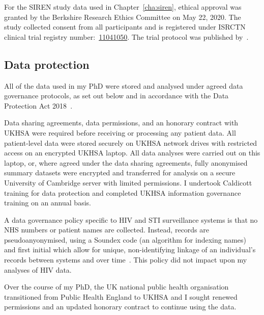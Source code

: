 For the SIREN study data used in Chapter~\ref{cha:siren}, ethical approval was granted by the Berkshire Research Ethics Committee on May 22, 2020. The study collected consent from all participants and is registered under ISRCTN clinical trial registry number:\ \href{https://doi.org/10.1186/ISRCTN11041050}{11041050}. The trial protocol was published by~\cite{Wallace2022-vs}.

\subsection{Data protection}

All of the data used in my PhD were stored and analysed under agreed data governance protocols, as set out below and in accordance with the Data Protection Act 2018~\parencite{Spencer2019-ga}.

Data sharing agreements, data permissions, and an honorary contract with UKHSA were required before receiving or processing any patient data. All patient-level data were stored securely on UKHSA network drives with restricted access on an encrypted UKHSA laptop. All data analyses were carried out on this laptop, or, where agreed under the data sharing agreements, fully anonymised summary datasets were encrypted and transferred for analysis on a secure University of Cambridge server with limited permissions. I undertook Caldicott training for data protection and completed UKHSA information governance training on an annual basis.

A data governance policy specific to HIV and STI surveillance systems is that no NHS numbers or patient names are collected. Instead, records are pseudoanyonymised, using a Soundex code (an algorithm for indexing names)~\parencite{Mortimer1995-ls} and first initial which allow for unique, non-identifying linkage of an individual's records between systems and over time~\parencite{Govuk2023-uj}. This policy did not impact upon my analyses of HIV data.

Over the course of my PhD, the UK national public health organisation transitioned from Public Health England to UKHSA and I sought renewed permissions and an updated honorary contract to continue using the data.